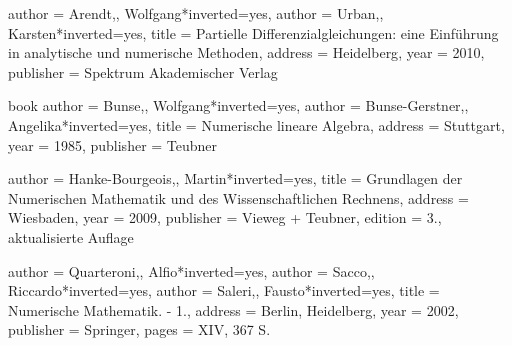 \begin{bibdiv}
\begin{biblist}
 {
    author = {{Arendt,}, Wolfgang}*{inverted={yes}},
    author = {{Urban,}, Karsten}*{inverted={yes}},
    title = {Partielle Differenzialgleichungen: eine Einführung in analytische und numerische Methoden},
    address = {Heidelberg},
    year = {2010},
    publisher = {Spektrum Akademischer Verlag}
}


 {book} {
    author = {{Bunse,}, Wolfgang}*{inverted={yes}},
    author = {{Bunse-Gerstner,}, Angelika}*{inverted={yes}},
    title = {Numerische lineare Algebra},
    address = {Stuttgart},
    year = {1985},
    publisher = {Teubner}
}


 {
    author = {{Hanke-Bourgeois,}, Martin}*{inverted={yes}},
    title = {Grundlagen der Numerischen Mathematik und des Wissenschaftlichen Rechnens},
    address = {Wiesbaden},
    year = {2009},
    publisher = {Vieweg + Teubner},
    edition = {3., aktualisierte Auflage}
}



 {
    author = {{Quarteroni,}, Alfio}*{inverted={yes}},
    author = {{Sacco,}, Riccardo}*{inverted={yes}},
    author = {{Saleri,}, Fausto}*{inverted={yes}},
    title = {Numerische Mathematik. - 1.},
    address = {Berlin, Heidelberg},
    year = {2002},
    publisher = {Springer},
    pages = {XIV, 367 S.}
}


\end{biblist}
\end{bibdiv}

